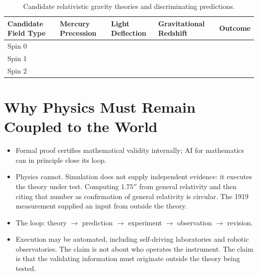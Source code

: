 \documentclass{article}
\begin{document}
\begin{table}[t]
\caption{Candidate relativistic gravity theories and discriminating predictions.}
\label{tab:gravity-test}
\vskip 0.15in
\begin{center}
\begin{small}
\begin{sc}
\begin{tabular}{p{}p{}p{}p{}p{}}
\toprule
Candidate Field Type & Mercury Precession & Light Deflection & Gravitational Redshift & Outcome \\
\midrule
Spin 0 &  &  &  &  \\
Spin 1 &  &  &  &  \\
Spin 2 &  &  &  &  \\
\bottomrule
\end{tabular}
\end{sc}
\end{small}
\end{center}
\vskip -0.1in
\end{table}

\section{Why Physics Must Remain Coupled to the World}
\label{sec:physics-coupled-world}
\begin{itemize}
  \item Formal proof certifies mathematical validity internally; AI for mathematics can in principle close its loop.
  \item Physics cannot. Simulation does not supply independent evidence: it executes the theory under test. Computing $1.75''$ from general relativity and then citing that number as confirmation of general relativity is circular. The 1919 measurement supplied an input from outside the theory.
  \item The loop: theory $\rightarrow$ prediction $\rightarrow$ experiment $\rightarrow$ observation $\rightarrow$ revision.
  \item Execution may be automated, including self-driving laboratories and robotic observatories. The claim is not about who operates the instrument. The claim is that the validating information must originate outside the theory being tested.
\end{itemize}
\end{document}

